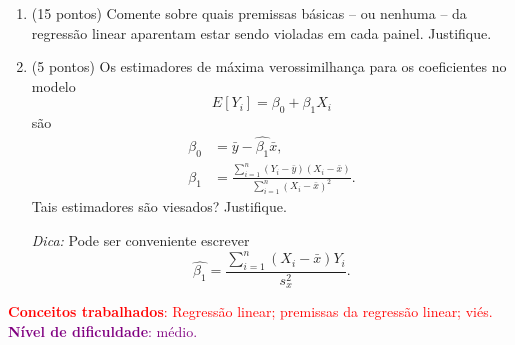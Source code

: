 \documentclass[a4paper,10pt, notitlepage]{report}
\begin{document}
\begin{enumerate}[label=\alph*)]
 \item (15 pontos) Comente sobre quais premissas básicas -- ou nenhuma -- da regressão linear aparentam estar sendo violadas em cada painel.
Justifique.
 \item (5 pontos) Os estimadores de máxima verossimilhança para os coeficientes no modelo
 \[ E[Y_i] = \beta_0 + \beta_1 X_i \]
 são 
 \begin{align*}
  \hat{\beta_0} &= \bar{y} - \hat{\beta_1}\bar{x},\\
  \hat{\beta_1} &= \frac{\sum_{i=1}^n (Y_i-\bar{y})(X_i-\bar{x})}{\sum_{i=1}^n \left(X_i - \bar{x}\right)^2}.
 \end{align*}
 Tais estimadores são viesados?
 Justifique.
 
 \textit{Dica:} Pode ser conveniente escrever
 $$\hat{\beta_1} = \frac{\sum_{i=1}^n \left(X_i-\bar{x}\right)Y_i}{s_x^2}.$$
 \end{enumerate}
\textcolor{red}{\textbf{Conceitos trabalhados}: Regressão linear; premissas da regressão linear; viés.}\\ \textcolor{purple}{\textbf{Nível de dificuldade}: médio.}\\
\end{document}
